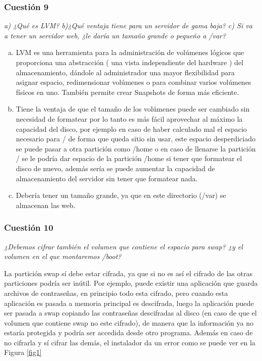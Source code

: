 \subsubsection{Cuestión 9}
\textit{a) ¿Qué es LVM? b)¿Qué ventaja tiene para un servidor de gama baja? c) Si va a tener un servidor web, ¿le daría un tamaño grande o pequeño a /var?} \newline
\begin{enumerate}[a)]
    \item LVM es una herramienta para la administración de volúmenes lógicos que proporciona una abstracción ( una vista independiente del hardware ) del almacenamiento, dándole al administrador una mayor flexibilidad para asignar espacio, redimensionar volúmenes o para combinar varios volúmenes físicos en uno. También permite crear Snapshots de forma más eficiente.  \cite{lvm1} \cite{lvm2}
    \item Tiene la ventaja de que el tamaño de los volúmenes puede ser cambiado sin necesidad de formatear por lo tanto es más fácil aprovechar al máximo la capacidad del disco, por ejemplo en caso de haber calculado mal el espacio necesario para / de forma que queda sitio sin usar, este espacio desperdiciado se puede pasar a otra partición como /home o en caso de llenarse la partición / se le podría dar espacio de la partición /home si tener que formatear el disco de nuevo, además sería se puede aumentar la capacidad de almacenamiento del servidor sin tener que formatear nada. \cite{lvm3}
    \item Debería tener un tamaño grande, ya que en este directorio (/var) se almacenan las web.
\end{enumerate}

\subsubsection{Cuestión 10}
\textit{¿Debemos cifrar también el volumen que contiene el espacio para swap? ¿y el volumen en el que montaremos /boot?} \newline

La partición swap sí debe estar cifrada, ya que si no es así el cifrado de las otras particiones podría ser inútil. Por ejemplo, puede existir una aplicación que guarda archivos de contraseñas, en principio todo esta cifrado, pero cuando esta aplicación es pasada a memoria principal es descifrada, luego la aplicación puede ser pasada a swap copiando las contraseñas descifradas al disco (en caso de que el volumen que contiene swap no este cifrado), de manera que la información ya no estaría protegida y podría ser accedida desde otro programa. \cite{swap} Además en caso de no cifrarla y sí cifrar las demás, el instalador da un error como se puede ver en la Figura \ref{fig1}

